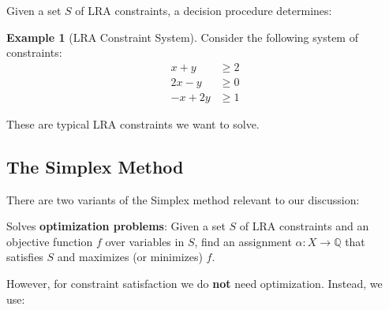 \documentclass[11pt,a4paper]{article}
\theoremstyle{definition}
\newtheorem{example}{Example}[section]
\theoremstyle{plain}
\theoremstyle{remark}
\begin{document}
Given a set $S$ of LRA constraints, a decision procedure determines:

\begin{center}
\end{center}

\begin{example}[LRA Constraint System]
Consider the following system of constraints:
\begin{align*}
x + y &\geq 2 \\
2x - y &\geq 0 \\
-x + 2y &\geq 1
\end{align*}

These are typical LRA constraints we want to solve.
\end{example}

\subsection{The Simplex Method}

There are two variants of the Simplex method relevant to our discussion:

\begin{tcolorbox}[colback=purple!5!white,colframe=purple!75!black,title=\textbf{Classical Simplex Method}]
Solves \textbf{optimization problems}: Given a set $S$ of LRA constraints and an objective function $f$ over variables in $S$, find an assignment $\alpha: X \rightarrow \mathbb{Q}$ that satisfies $S$ and maximizes (or minimizes) $f$.
\end{tcolorbox}

However, for constraint satisfaction we do \textbf{not} need optimization. Instead, we use:
\end{document}
